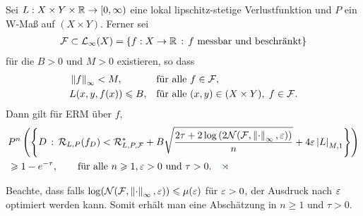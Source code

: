 \begin{prop}[Orakelungleichung II]
\label{prop:4.2.4}
Sei $L:X\times Y\times\mathbb{R}\to [0,\infty)$ eine lokal lipschitz-stetige
Verlustfunktion und $P$ ein W-Maß auf $(X\times Y)$. Ferner sei
\begin{align*}
\mathcal{F}\subset\mathcal{L}_\infty(X) = \left\{ f: X\to\mathbb{R}\,:\,f\text{ messbar und beschränkt}\right\}
\end{align*}
für die $B>0$ und $M>0$ existieren, so dass
\begin{align*}
&\left\|f\right\|_\infty  < M, && \text{für alle }f\in\mathcal{F},\\
&L(x,y,f(x)) \leqslant B, && \text{für alle }(x,y)\in (X\times Y),\; f\in\mathcal{F}.
\end{align*}
Dann gilt für ERM über $f$,
\begin{align*}
&P^n\left( \setdef{D}{\RR_{L,P}(f_D) < \RR_{L,P,\FF}^* +
B\sqrt{\frac{2\tau+2\log\left(2\NN(\FF,\norm{\cdot}_\infty,\ep)\right)
}{n}}+4\ep\abs{L}_{M,1} } \right)\\
&\ge 1-e^{-\tau},\qquad \text{für alle }n\ge1, \ep > 0\text{ und }\tau >
0.\fishhere
\end{align*}
\end{prop}

Beachte, dass falls $\log(\mathcal{N}(\mathcal{F},\left\|\cdot\right\|_\infty,\varepsilon)) \leqslant \mu(\varepsilon)$ für
$\varepsilon > 0$, der Ausdruck nach $\varepsilon$ optimiert werden kann. Somit erhält man eine
Abschätzung in $n\ge 1$ und $\tau > 0$.

